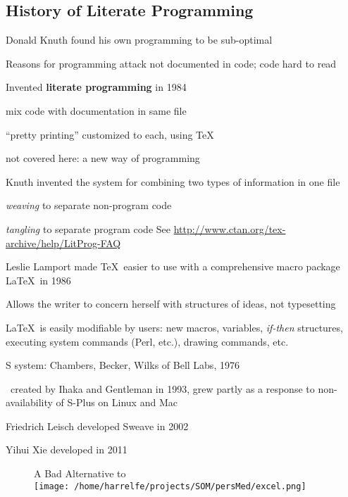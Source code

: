 \subsection{History of Literate Programming}
\bi
\item Donald Knuth found his own programming to be sub-optimal
\item Reasons for programming attack not documented in code; code hard to read
\item Invented \textbf{literate programming} in 1984
 \bi
 \item mix code with documentation in same file
 \item ``pretty printing'' customized to each, using \TeX
 \item not covered here: a new way of programming
 \ei
\item Knuth invented the  system for combining two types of
 information in one file
 \bi
 \item \emph{weaving} to separate non-program code
 \item \emph{tangling} to separate program code
 \ei
\ei
See \url{http://www.ctan.org/tex-archive/help/LitProg-FAQ}
\bi
\item Leslie Lamport made \TeX\ easier to use with a comprehensive
 macro package \LaTeX\ in 1986
\item Allows the writer to concern herself with structures of ideas,
not typesetting
\item \LaTeX\ is easily modifiable by users: new macros,
variables, \emph{if-then} structures, executing system commands (Perl,
etc.), drawing commands, etc.
\item S system: Chambers, Becker, Wilks of Bell Labs, 1976
\item \R\ created by Ihaka and Gentleman in 1993, grew partly as a response
 to non-availability of S-Plus on Linux and Mac
\item Friedrich Leisch developed Sweave in 2002
\item Yihui Xie developed  in 2011
\ei

\begin{figure}\begin{center}{\smaller[-2] A Bad Alternative to }\\%
\texttt{[image: /home/harrelfe/projects/SOM/persMed/excel.png]}
\end{center}\end{figure}

